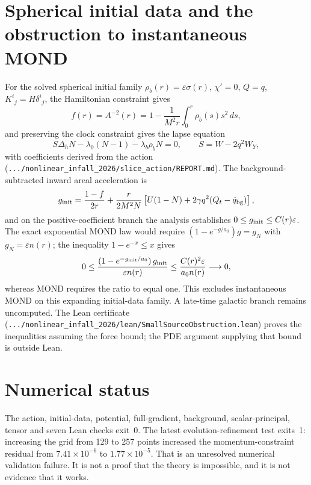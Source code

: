 \documentclass[11pt,letterpaper]{article}
\begin{document}
\section{Spherical initial data and the obstruction to instantaneous MOND}
For the solved spherical initial family $\rho_b(r)=\varepsilon\sigma(r)$, $\chi'=0$, $Q=q$, $K^i{}_j=H\delta^i{}_j$, the Hamiltonian constraint gives
\begin{equation}
f(r)=A^{-2}(r)=1-\frac{1}{M^2r}\int_0^r\rho_b(s)s^2\,ds,
\end{equation}
and preserving the clock constraint gives the lapse equation
\begin{equation}
S\Delta_hN-\lambda_0(N-1)-\lambda_b\rho_bN=0,\qquad S=W-2q^2W_Y,
\end{equation}
with coefficients derived from the action (\texttt{.../nonlinear\_infall\_2026/slice\_action/REPORT.md}). The background-subtracted inward areal acceleration is
\begin{equation}
g_{\rm init}=\frac{1-f}{2r}+\frac{r}{2M^2N}\left[U(1-N)+2\gamma q^2(Q_t-\dot q_{\rm bg})\right],
\end{equation}
and on the positive-coefficient branch the analysis establishes $0\le g_{\rm init}\le C(r)\varepsilon$. The exact exponential MOND law would require $(1-e^{-g/a_0})g=g_N$ with $g_N=\varepsilon n(r)$; the inequality $1-e^{-x}\le x$ gives
\begin{equation}
0\le\frac{(1-e^{-g_{\rm init}/a_0})\,g_{\rm init}}{\varepsilon n(r)}\le\frac{C(r)^2\varepsilon}{a_0n(r)}\longrightarrow0,
\end{equation}
whereas MOND requires the ratio to equal one. This excludes instantaneous MOND on this expanding initial-data family. A late-time galactic branch remains uncomputed. The Lean certificate (\texttt{.../nonlinear\_infall\_2026/lean/SmallSourceObstruction.lean}) proves the inequalities assuming the force bound; the PDE argument supplying that bound is outside Lean.

\section{Numerical status}
The action, initial-data, potential, full-gradient, background, scalar-principal, tensor and seven Lean checks exit~0. The latest evolution-refinement test exits~1: increasing the grid from 129 to 257 points increased the momentum-constraint residual from $7.41\times10^{-6}$ to $1.77\times10^{-5}$. That is an unresolved numerical validation failure. It is not a proof that the theory is impossible, and it is not evidence that it works.
\end{document}
